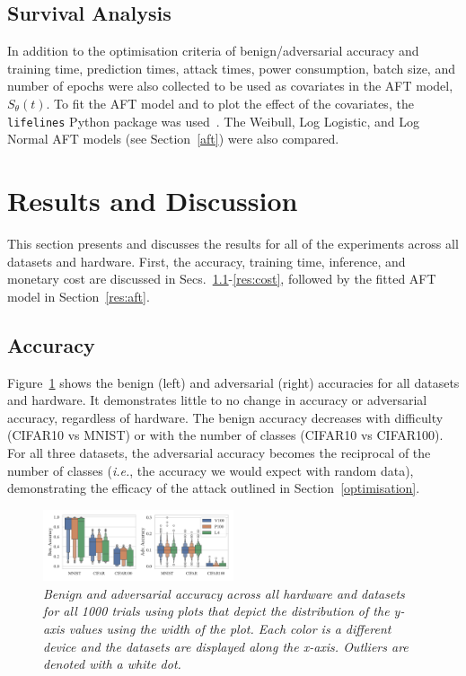 \documentclass[conference]{IEEEtran}
\newcommand{\cm}[1]{\textit{{\color{blue}#1}}}
\begin{document}
\subsection{Survival Analysis}

In addition to the optimisation criteria of benign/adversarial accuracy and training time, prediction times, attack times, power consumption, batch size, and number of epochs were also collected to be used as covariates in the AFT model, $S_{\theta}(t)$. To fit the AFT model and to plot the effect of the covariates, the \texttt{lifelines} Python package was used~\cite{lifelines}. The Weibull, Log Logistic, and Log Normal AFT models (see Section~\ref{aft}) were also compared. 


\section{Results and Discussion}
\label{results}

This section presents and discusses the results for all of the experiments across all datasets and hardware. First, the accuracy, training time, inference, and monetary cost are discussed in Secs.~\ref{res:acc}-\ref{res:cost}, followed by the fitted AFT model in Section~\ref{res:aft}.


\subsection{Accuracy}
\label{res:acc}

Figure~\ref{fig:acc} shows the benign (left) and adversarial (right) accuracies for all datasets and hardware. It demonstrates little to no change in accuracy or adversarial accuracy, regardless of hardware. The benign accuracy decreases with difficulty (CIFAR10 vs MNIST) or with the number of classes (CIFAR10 vs CIFAR100). For all three datasets, the adversarial accuracy becomes the reciprocal of the number of classes (\textit{i.e.}, the accuracy we would expect with random data), demonstrating the efficacy of the attack outlined in Section~\ref{optimisation}.

\begin{figure}[h!]
    \centering
    \includegraphics[width=0.5\textwidth,clip]{plots/combined/acc.pdf}
    \caption{\cm{Benign and adversarial accuracy across all hardware and datasets for all 1000 trials using plots that depict the distribution of the y-axis values using the width of the plot. Each color is a different device and the datasets are displayed along the x-axis. Outliers are denoted with a white dot.}}
    \label{fig:acc}
\end{figure}
\end{document}
